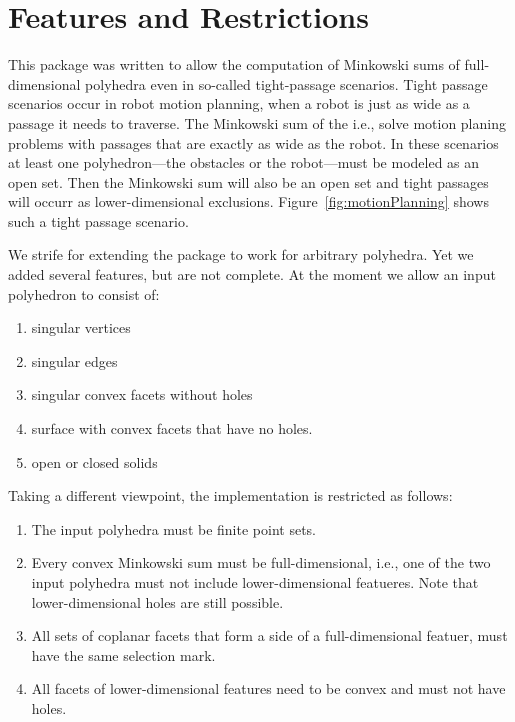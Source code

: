 \section{Features and Restrictions}
\label{sec:restrictions}

This package was written to allow the computation of Minkowski sums of
full-dimensional polyhedra even in so-called tight-passage scenarios.
Tight passage scenarios occur in robot motion planning, when a robot
is just as wide as a passage it needs to traverse. The Minkowski sum
of the i.e., solve motion planing problems with passages that are
exactly as wide as the robot. In these scenarios at least one
polyhedron---the obstacles or the robot---must be modeled as an open
set. Then the Minkowski sum will also be an open set and tight
passages will occurr as lower-dimensional
exclusions. Figure~\ref{fig:motionPlanning} shows such a tight
passage scenario.

We strife for extending the package to work for arbitrary
polyhedra. Yet we added several features, but are not complete. At
the moment we allow an input polyhedron to consist of:
\begin{enumerate}
\item singular vertices
\item singular edges
\item singular convex facets without holes
\item surface with convex facets that have no holes.
\item open or closed solids
\end{enumerate}

Taking a different viewpoint, the implementation is restricted as
follows:
\begin{enumerate}
\item The input polyhedra must be finite point sets.
\item Every convex Minkowski sum must be full-dimensional, i.e., one 
of the two input polyhedra must not include lower-dimensional
featueres. Note that lower-dimensional holes are still possible.
\item All sets of coplanar facets that form a side of a full-dimensional
featuer, must have the same selection mark.
\item All facets of lower-dimensional features need to be convex and 
must not have holes.
\end{enumerate}

